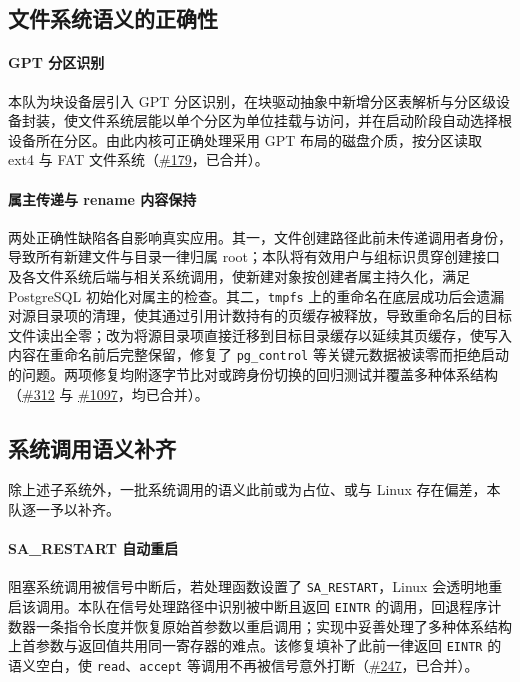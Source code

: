 \subsection{文件系统语义的正确性}

\paragraph{GPT 分区识别}
本队为块设备层引入 GPT 分区识别，在块驱动抽象中新增分区表解析与分区级设备封装，使文件系统层能以单个分区为单位挂载与访问，并在启动阶段自动选择根设备所在分区。由此内核可正确处理采用 GPT 布局的磁盘介质，按分区读取 ext4 与 FAT 文件系统（\href{https://github.com/rcore-os/tgoskits/pull/179}{\#179}，已合并）。

\paragraph{属主传递与 rename 内容保持}
两处正确性缺陷各自影响真实应用。其一，文件创建路径此前未传递调用者身份，导致所有新建文件与目录一律归属 root；本队将有效用户与组标识贯穿创建接口及各文件系统后端与相关系统调用，使新建对象按创建者属主持久化，满足 PostgreSQL 初始化对属主的检查。其二，\texttt{tmpfs} 上的重命名在底层成功后会遗漏对源目录项的清理，使其通过引用计数持有的页缓存被释放，导致重命名后的目标文件读出全零；改为将源目录项直接迁移到目标目录缓存以延续其页缓存，使写入内容在重命名前后完整保留，修复了 \texttt{pg\_control} 等关键元数据被读零而拒绝启动的问题。两项修复均附逐字节比对或跨身份切换的回归测试并覆盖多种体系结构（\href{https://github.com/rcore-os/tgoskits/pull/312}{\#312} 与 \href{https://github.com/rcore-os/tgoskits/pull/1097}{\#1097}，均已合并）。

\subsection{系统调用语义补齐}

除上述子系统外，一批系统调用的语义此前或为占位、或与 Linux 存在偏差，本队逐一予以补齐。

\paragraph{SA\_RESTART 自动重启}
阻塞系统调用被信号中断后，若处理函数设置了 \texttt{SA\_RESTART}，Linux 会透明地重启该调用。本队在信号处理路径中识别被中断且返回 \texttt{EINTR} 的调用，回退程序计数器一条指令长度并恢复原始首参数以重启调用；实现中妥善处理了多种体系结构上首参数与返回值共用同一寄存器的难点。该修复填补了此前一律返回 \texttt{EINTR} 的语义空白，使 \texttt{read}、\texttt{accept} 等调用不再被信号意外打断（\href{https://github.com/rcore-os/tgoskits/pull/247}{\#247}，已合并）。

